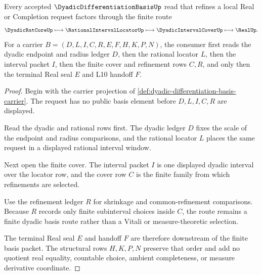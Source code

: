 \begin{theorem}
\label{thm:dyadic-differentiation-basis-finite-refinement}
Every accepted $\DyadicDifferentiationBasisUp$ read that refines a local Real or Completion request factors through the finite route
$$
\DyadicRatCoreUp \longmapsto \RationalIntervalLocatorUp \longmapsto \DyadicIntervalCoverUp \longmapsto \RealUp .
$$
For a carrier $B=(D,L,I,C,R,E,F,H,K,P,N)$, the consumer first reads the dyadic endpoint and radius ledger $D$, then the rational locator $L$, then the interval packet $I$, then the finite cover and refinement rows $C,R$, and only then the terminal Real seal $E$ and L10 handoff $F$.
\end{theorem}
\begin{proof}
Begin with the carrier projection of \autoref{def:dyadic-differentiation-basis-carrier}. The request has no public basis element before $D,L,I,C,R$ are displayed.

Read the dyadic and rational rows first. The dyadic ledger $D$ fixes the scale of the endpoint and radius comparisons, and the rational locator $L$ places the same request in a displayed rational interval window.

Next open the finite cover. The interval packet $I$ is one displayed dyadic interval over the locator row, and the cover row $C$ is the finite family from which refinements are selected.

Use the refinement ledger $R$ for shrinkage and common-refinement comparisons. Because $R$ records only finite subinterval choices inside $C$, the route remains a finite dyadic basis route rather than a Vitali or measure-theoretic selection.

The terminal Real seal $E$ and handoff $F$ are therefore downstream of the finite basis packet. The structural rows $H,K,P,N$ preserve that order and add no quotient real equality, countable choice, ambient completeness, or measure derivative coordinate.
\end{proof}



